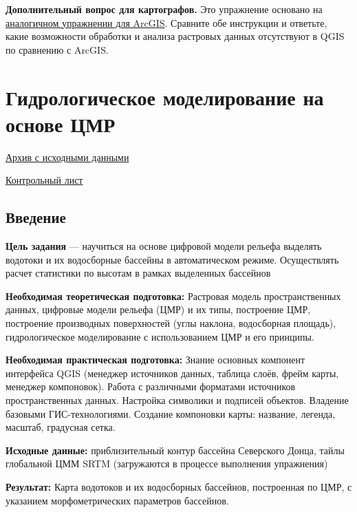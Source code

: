 \documentclass[
  12pt,
]{book}
\begin{document}
\textbf{Дополнительный вопрос для картографов.} Это упражнение основано на \href{https://tsamsonov.github.io/arcgis-course/weighted-overlay.html}{аналогичном упражнении для ArcGIS}. Сравните обе инструкции и ответьте, какие возможности обработки и анализа растровых данных отсутствуют в QGIS по сравнению с ArcGIS.

\hypertarget{hydrodem}{%
\chapter{Гидрологическое моделирование на основе ЦМР}\label{hydrodem}}

\href{https://github.com/aentin/qgis-course/raw/master/files/Ex10.zip}{Архив с исходными данными}

\href{https://github.com/aentin/qgis-course/raw/master/files/Ex10_\%D0\%BE\%D1\%82\%D1\%87\%D1\%91\%D1\%82.docx}{Контрольный лист}

\hypertarget{hydrodem-intro}{%
\section{Введение}\label{hydrodem-intro}}

\textbf{Цель задания} --- научиться на основе цифровой модели рельефа выделять водотоки и их водосборные бассейны в автоматическом режиме. Осуществлять расчет статистики по высотам в рамках выделенных бассейнов

\textbf{Необходимая теоретическая подготовка:} Растровая модель пространственных данных, цифровые модели рельефа (ЦМР) и их типы, построение ЦМР, построение производных поверхностей (углы наклона, водосборная площадь), гидрологическое моделирование с использованием ЦМР и его принципы.

\textbf{Необходимая практическая подготовка:} Знание основных компонент интерфейса QGIS (менеджер источников данных, таблица слоёв, фрейм карты, менеджер компоновок). Работа с различными форматами источников пространственных данных. Настройка символики и подписей объектов. Владение базовыми ГИС-технологиями. Создание компоновки карты: название, легенда, масштаб, градусная сетка.

\textbf{Исходные данные:} приблизительный контур бассейна Северского Донца, тайлы глобальной ЦММ SRTM (загружаются в процессе выполнения упражнения)

\textbf{Результат:} Карта водотоков и их водосборных бассейнов, построенная по ЦМР, с указанием морфометрических параметров бассейнов.
\end{document}
